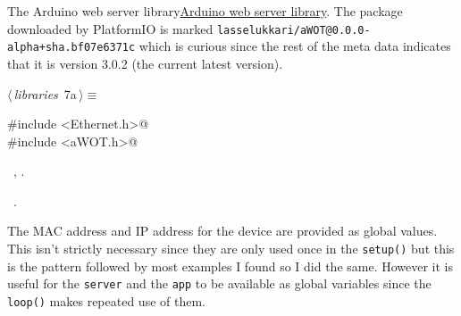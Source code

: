 \documentclass[a4paper, 11pt]{article}
\begin{document}
The Arduino web server library\href{https://github.com/lasselukkari/awot}{Arduino web server library}.
The package downloaded by PlatformIO is marked
\verb|lasselukkari/aWOT@0.0.0-alpha+sha.bf07e6371c|
which is curious since the rest of the meta data indicates that it is version 3.0.2
(the current latest version).

\begin{flushleft} \small
\begin{minipage}{\linewidth}\label{scrap7}\raggedright\small
{}$\langle\,${\itshape libraries}\nobreak\ {\footnotesize{7a}}$\,\rangle\equiv$
\vspace{-1ex}
\begin{list}{}{\setlength{\leftmargin}{1em}} \item
\mbox{}\lstinline@#include <Ethernet.h>@\\
\mbox{}\lstinline@#include <aWOT.h>@\\
\mbox{}{\NWsep}
\end{list}
\vspace{-1ex}
\vspace{-1ex}
\footnotesize
\begin{list}{}{\setlength{\itemsep}{-\parsep}\setlength{\itemindent}{-\leftmargin}}
\item \NWtxtMacroDefBy\ , .
\item \NWtxtMacroRefIn\ .
\end{list}
\end{minipage}
\end{flushleft}

The MAC address and IP address for the device
are provided as global values.
This isn't strictly necessary since they are only used once in the \verb|setup()|
but this is the pattern followed by most examples I found so I did the same.
However it is useful for the \verb|server| and the \verb|app| to be available
as global variables since the \verb|loop()| makes repeated use of them.
\end{document}
